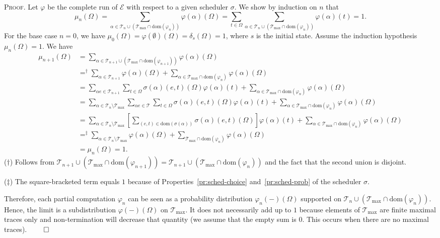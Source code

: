 \documentclass[review]{elsart}
\newenvironment{proof}{\par
\noindent
\textsc{Proof. }
\noindent}{\hfill\(\qed\)}
\newcommand{\dom}{\mathrm{dom}}
\newcommand{\EE}{\mathcal{E}}
\newcommand{\TT}{\mathcal{T}}
\begin{document}
\begin{proof}
Let $\varphi$ be the complete run of $\EE$ with respect to a given scheduler $\sigma$. We show by induction on $n$ that
\[
	\mu_{n}(\Omega) = \sum_{\alpha{\in} \TT_{n}{\cup}(\TT_{\max}{\cap} \dom(\varphi_n))}\varphi(\alpha)(\Omega) = \sum_{t{\in}\Omega} \sum_{\alpha{\in} \TT_{n}{\cup}(\TT_{\max}{\cap} \dom(\varphi_n))}\varphi(\alpha)(t) = 1.
\]
For the base case $n=0$, we have $\mu_0(\Omega) = \varphi(\emptyset)(\Omega) = \delta_s(\Omega) = 1$, where $s$ is the initial state. Assume the induction hypothesis $\mu_n(\Omega) = 1$. We have
\begin{align*}
\mu_{n{+}1}(\Omega) & =   \sum_{\alpha{\in} \TT_{n{+}1}{\cup}(\TT_{\max}{\cap} \dom(\varphi_{n{+}1}))}\varphi(\alpha)(\Omega)\\
& =^{\dag} \sum_{\alpha{\in} \TT_{n{+}1}}\varphi(\alpha)(\Omega) {+} \sum_{\alpha{\in}\TT_{\max}{\cap} \dom(\varphi_n)}\varphi(\alpha)(\Omega)\\
& = \sum_{\alpha e{\in} \TT_{n{+}1}}\sum_{t{\in}\Omega}\sigma(\alpha)(e,t)(\Omega)\varphi(\alpha)(t) {+} \sum_{\alpha{\in} \TT_{\max}{\cap} \dom(\varphi_n)}\varphi(\alpha)(\Omega)\\
& =  \sum_{\alpha{\in} \TT_{n}{\setminus}\TT_{\max}}\sum_{\alpha e{\in} \TT}\sum_{t{\in}\Omega}\sigma(\alpha)(e,t)(\Omega)\varphi(\alpha)(t) {+} \sum_{\alpha{\in} \TT_{\max}{\cap} \dom(\varphi_n)}\varphi(\alpha)(\Omega)\\
& = \sum_{\alpha{\in} \TT_{n}{\setminus}\TT_{\max}}\left[\sum_{(e,t){\in}\dom(\sigma(\alpha))}\sigma(\alpha)(e,t)(\Omega)\right]\varphi(\alpha)(t) {+} \sum_{\alpha{\in}\TT_{\max}{\cap} \dom(\varphi_n)}\varphi(\alpha)(\Omega)\\
& =^{\ddag} \sum_{\alpha{\in} \TT_{n}{\setminus}\TT_{\max}}\varphi(\alpha)(\Omega) {+} \sum_{\TT_{\max}{\cap} \dom(\varphi_n)}\varphi(\alpha)(\Omega)\\
& =  \mu_n(\Omega) = 1.
\end{align*} 
($\dag$) Follows from $\TT_{n{+}1}{\cup}(\TT_{\max}{\cap} \dom(\varphi_{n{+}1})) = \TT_{n{+}1}{\cup}(\TT_{\max}{\cap} \dom(\varphi_{n}))$ and the fact that the second union is disjoint.

($\ddag$) The square-bracketed term equals $1$ because of Properties~\ref{pr:sched-choice} and~\ref{pr:sched-prob} of the scheduler $\sigma$.


Therefore, each partial computation $\varphi_n$ can be seen as a probability distribution $\varphi_n(-)(\Omega)$ supported on $\TT_n{\cup}(\TT_{\max}{\cap}\dom(\varphi_n))$. Hence, the limit is a subdistribution $\varphi(-)(\Omega)$ on $\TT_{\max}$. It does not necessarily add up to $1$ because elements of $\TT_{\max}$ are finite maximal traces only and non-termination will decrease that quantity (we assume that the empty sum is $0$. This occurs when there are no maximal traces).
\end{proof}
\end{document}

